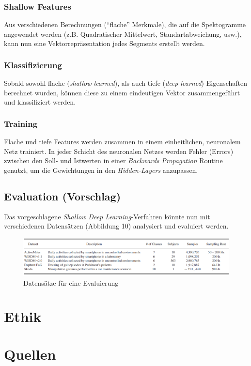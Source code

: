 \documentclass[11pt]{article}
\begin{document}
    \subsubsection{Shallow Features}
    Aus verschiedenen Berechnungen ("`flache"' Merkmale), die auf die Spektogramme angewendet werden
    (z.B. Quadratischer Mittelwert, Standartabweichung, usw.), kann nun eine Vektorrepräsentation
    jedes Segments erstellt werden.

    \subsubsection{Klassifizierung}
    Sobald sowohl flache (\textit{shallow learned}), als auch tiefe (\textit{deep learned})
    Eigenschaften berechnet wurden, können diese zu einem eindeutigen Vektor zusammengeführt und
    klassifiziert werden.

    \subsubsection{Training}
    Flache und tiefe Features werden zusammen in einem einheitlichen, neuronalem Netz trainiert. In
    jeder Schicht des neuronalen Netzes werden Fehler (Errors) zwischen den Soll- und Istwerten in
    einer \textit{Backwards Propagation} Routine genutzt, um die Gewichtungen in den
    \textit{Hidden-Layers} anzupassen.

    \subsection{Evaluation (Vorschlag)}
    Das vorgeschlagene \textit{Shallow Deep Learning}-Verfahren könnte nun mit verschiedenen Datensätzen
    (Abbildung 10) analysiert und evaluiert werden.

    \begin{figure}[ht!]
        \centerings
        \includegraphics[width=16cm]{../../resources/datasets.png}
        \caption{Datensätze für eine Evaluierung}
    \end{figure}

    \section{Ethik}


    \section{Quellen}
\end{document}
